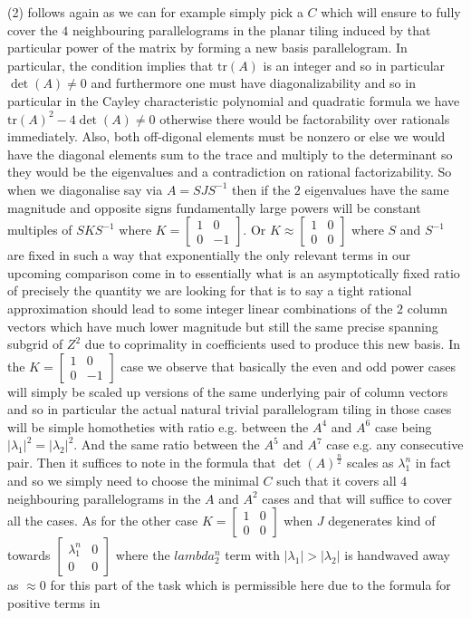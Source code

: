 (2) follows again as we can for example simply pick a $C$ which will ensure to fully cover the $4$ neighbouring parallelograms in the planar tiling induced by that particular power of the matrix by forming a new basis parallelogram. In particular, the condition implies that $\text{tr}(A)$ is an integer and so in particular $\det(A)\neq 0$ and furthermore one must have diagonalizability and so in particular in the Cayley characteristic polynomial and quadratic formula we have $\text{tr}(A)^2-4\det(A)\neq 0$ otherwise there would be factorability over rationals immediately. Also, both off-digonal elements must be nonzero or else we would have the diagonal elements sum to the trace and multiply to the determinant so they would be the eigenvalues and a contradiction on rational factorizability. So when we diagonalise say via $A=SJS^{-1}$ then if the $2$ eigenvalues have the same magnitude and opposite signs fundamentally large powers will be constant multiples of $SKS^{-1}$ where $K=\begin{bmatrix} 1 & 0 \\ 0 & -1 \end{bmatrix}$. Or $K \approx \begin{bmatrix} 1 & 0 \\ 0 & 0 \end{bmatrix}$ where $S$ and $S^{-1}$ are fixed in such a way that exponentially the only relevant terms in our upcoming comparison come in to essentially what is an asymptotically fixed ratio of precisely the quantity we are looking for that is to say a tight rational approximation should lead to some integer linear combinations of the $2$ column vectors which have much lower magnitude but still the same precise spanning subgrid of $Z^2$ due to coprimality in coefficients used to produce this new basis. In the $K=\begin{bmatrix} 1 & 0 \\ 0 & -1 \end{bmatrix}$ case we observe that basically the even and odd power cases will simply be scaled up versions of the same underlying pair of column vectors and so in particular the actual natural trivial parallelogram tiling in those cases will be simple homotheties with ratio e.g. between the $A^4$ and $A^6$ case being $|\lambda_1|^2=|\lambda_2|^2$. And the same ratio between the $A^5$ and $A^7$ case e.g. any consecutive pair. Then it suffices to note in the formula that $\det(A)^{\frac{n}{2}}$ scales as $\lambda_1^n$ in fact and so we simply need to choose the minimal $C$ such that it covers all $4$ neighbouring parallelograms in the $A$ and $A^2$ cases and that will suffice to cover all the cases. As for the other case $K=\begin{bmatrix} 1 & 0 \\ 0 & 0 \end{bmatrix}$ when $J$ degenerates kind of towards $\begin{bmatrix} \lambda_1^n & 0 \\ 0 & 0 \end{bmatrix}$ where the $lambda_2^n$ term with $|\lambda_1|>|\lambda_2|$ is handwaved away as $\approx 0$ for this part of the task which is permissible here due to the formula for positive terms in 